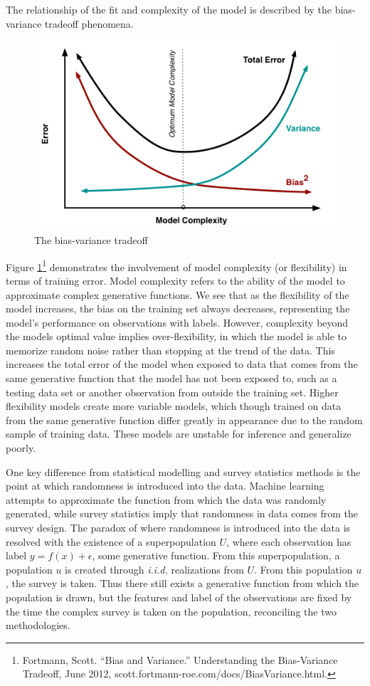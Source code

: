 \documentclass[12pt,twoside]{reedthesis}
\begin{document}
The relationship of the fit and complexity of the model is described by
the bias-variance tradeoff phenomena.
\begin{figure}
\centering
\includegraphics{figure/biasvariance.png}
\caption{\label{fig:biasvar}The bias-variance tradeoff}
\end{figure}
Figure \ref{fig:biasvar}\footnote{Fortmann, Scott. ``Bias and
  Variance.'' Understanding the Bias-Variance Tradeoff, June 2012,
  scott.fortmann-roe.com/docs/BiasVariance.html.} demonstrates the
involvement of model complexity (or flexibility) in terms of training
error. Model complexity refers to the ability of the model to
approximate complex generative functions. We see that as the flexibility
of the model increases, the bias on the training set always decreases,
representing the model's performance on observations with labels.
However, complexity beyond the models optimal value implies
over-flexibility, in which the model is able to memorize random noise
rather than stopping at the trend of the data. This increases the total
error of the model when exposed to data that comes from the same
generative function that the model has not been exposed to, such as a
testing data set or another observation from outside the training set.
Higher flexibility models create more variable models, which though
trained on data from the same generative function differ greatly in
appearance due to the random sample of training data. These models are
unstable for inference and generalize poorly.

One key difference from statistical modelling and survey statistics
methods is the point at which randomness is introduced into the data.
Machine learning attempts to approximate the function from which the
data was randomly generated, while survey statistics imply that
randomness in data comes from the survey design. The paradox of where
randomness is introduced into the data is resolved with the existence of
a superpopulation \(U\), where each observation has label
\(y = f(x) + \epsilon\), some generative function. From this
superpopulation, a population \(u\) is created through \emph{i.i.d.}
realizations from \(U\). From this population \(u\), the survey is
taken. Thus there still exists a generative function from which the
population is drawn, but the features and label of the observations are
fixed by the time the complex survey is taken on the population,
reconciling the two methodologies.
\end{document}
